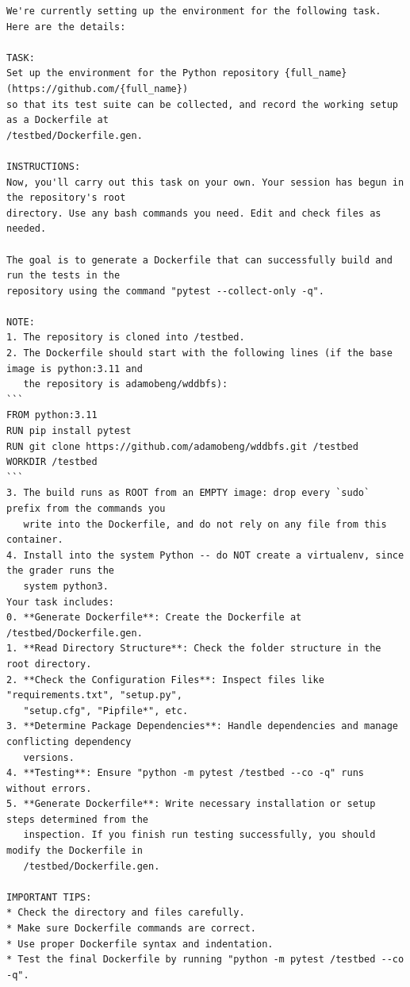 \begin{lstlisting}[style=promptstyle]
We're currently setting up the environment for the following task. Here are the details:

TASK:
Set up the environment for the Python repository {full_name} (https://github.com/{full_name})
so that its test suite can be collected, and record the working setup as a Dockerfile at
/testbed/Dockerfile.gen.

INSTRUCTIONS:
Now, you'll carry out this task on your own. Your session has begun in the repository's root
directory. Use any bash commands you need. Edit and check files as needed.

The goal is to generate a Dockerfile that can successfully build and run the tests in the
repository using the command "pytest --collect-only -q".

NOTE:
1. The repository is cloned into /testbed.
2. The Dockerfile should start with the following lines (if the base image is python:3.11 and
   the repository is adamobeng/wddbfs):
```
FROM python:3.11
RUN pip install pytest
RUN git clone https://github.com/adamobeng/wddbfs.git /testbed
WORKDIR /testbed
```
3. The build runs as ROOT from an EMPTY image: drop every `sudo` prefix from the commands you
   write into the Dockerfile, and do not rely on any file from this container.
4. Install into the system Python -- do NOT create a virtualenv, since the grader runs the
   system python3.
Your task includes:
0. **Generate Dockerfile**: Create the Dockerfile at /testbed/Dockerfile.gen.
1. **Read Directory Structure**: Check the folder structure in the root directory.
2. **Check the Configuration Files**: Inspect files like "requirements.txt", "setup.py",
   "setup.cfg", "Pipfile*", etc.
3. **Determine Package Dependencies**: Handle dependencies and manage conflicting dependency
   versions.
4. **Testing**: Ensure "python -m pytest /testbed --co -q" runs without errors.
5. **Generate Dockerfile**: Write necessary installation or setup steps determined from the
   inspection. If you finish run testing successfully, you should modify the Dockerfile in
   /testbed/Dockerfile.gen.

IMPORTANT TIPS:
* Check the directory and files carefully.
* Make sure Dockerfile commands are correct.
* Use proper Dockerfile syntax and indentation.
* Test the final Dockerfile by running "python -m pytest /testbed --co -q".
\end{lstlisting}

